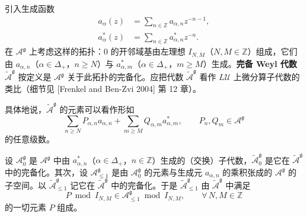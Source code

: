 引入生成函数
\begin{align}
    a_\alpha(z)&=\sum_{n\in\mathbb{Z}}a_{\alpha,n}z^{-n-1},
        \tag{5.3-4}\\
    a^*_\alpha(z)&=\sum_{n\in\mathbb{Z}}a^*_{\alpha,n}z^{-n}.
        \tag{5.3-5}
\end{align}
在 $\mathcal{A}^{\mathfrak{g}}$ 上考虑这样的拓扑：$0$ 的开邻域基由左理想 $I_{N,M}$（$N,M\in\mathbb{Z}$）组成，它们由 $a_{\alpha,n}$（$\alpha\in\Delta_+$，$n\ge N$）与 $a^*_{\alpha,m}$（$\alpha\in\Delta_+$，$m\ge M$）生成。\textbf{完备 Weyl 代数} $\widetilde{\mathcal{A}}^{\mathfrak{g}}$ 按定义是 $\mathcal{A}^{\mathfrak{g}}$ 关于此拓扑的完备化。应把代数 $\widetilde{\mathcal{A}}^{\mathfrak{g}}$ 看作 $L\mathcal{U}$ 上微分算子代数的类比（细节见 [Frenkel and Ben-Zvi 2004] 第 12 章）。

具体地说，$\widetilde{\mathcal{A}}^{\mathfrak{g}}$ 的元素可以看作形如
\begin{equation}
    \sum_{n\ge N}P_{\alpha,n}a_{\alpha,n}
    +\sum_{m\ge M}Q_{\alpha,m}a^*_{\alpha,m},
    \qquad P_n,Q_m\in\mathcal{A}^{\mathfrak{g}}
    \tag{5.3-6}
\end{equation}
的任意级数。


设 $\mathcal{A}^{\mathfrak{g}}_0$ 是 $\mathcal{A}^{\mathfrak{g}}$ 中由 $a^*_{\alpha,n}$（$\alpha\in\Delta_+$，$n\in\mathbb{Z}$）生成的（交换）子代数，$\widetilde{\mathcal{A}}^{\mathfrak{g}}_0$ 是它在 $\widetilde{\mathcal{A}}^{\mathfrak{g}}$ 中的完备化。其次，设 $\mathcal{A}^{\mathfrak{g}}_{\le1}$ 是由 $\mathcal{A}^{\mathfrak{g}}_0$ 的元素与生成元 $a_{\alpha,n}$ 的乘积张成的 $\mathcal{A}^{\mathfrak{g}}$ 的子空间。以 $\widetilde{\mathcal{A}}^{\mathfrak{g}}_{\le1}$ 记它在 $\widetilde{\mathcal{A}}^{\mathfrak{g}}$ 中的完备化。于是 $\widetilde{\mathcal{A}}^{\mathfrak{g}}_{\le1}$ 由 $\widetilde{\mathcal{A}}^{\mathfrak{g}}$ 中满足
\[
    P\bmod I_{N,M}\in\mathcal{A}^{\mathfrak{g}}_{\le1}\bmod I_{N,M},
    \qquad \forall\,N,M\in\mathbb{Z}
\]
的一切元素 $P$ 组成。

